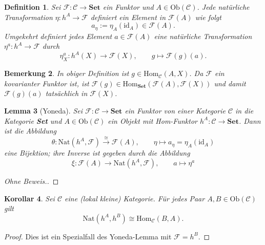 \documentclass[a4paper, 11pt]{scrartcl}
\newcommand{\Hom}{\text{Hom}}
\newcommand{\id}{\text{id}}
\newcommand{\Ob}{\text{Ob}}
\theoremstyle{basicstyle}
\newtheorem{definition}{Definition}[section]
\newtheorem{bemerkung}[definition]{Bemerkung}
\newtheorem{lemma}[definition]{Lemma}
\newtheorem{korollar}[definition]{Korollar}
\begin{document}
    \begin{definition}
        Sei \(\mathcal{F}: \mathcal{C} \to \textbf{Set}\) ein Funktor und \(A \in \Ob(\mathcal{C})\).
        Jede natürliche Transformation \(\eta: h^A \to \mathcal{F}\) definiert ein Element in \(\mathcal{F}(A)\) wie folgt
        \[a_{\eta} := \eta_A(\id_A) \in \mathcal{F}(A).\]
        Umgekehrt definiert jedes Element \(a \in \mathcal{F}(A)\) eine natürliche Transformation \(\eta^a: h^A \to \mathcal{F}\) durch
        \[\eta_X^a: h^A(X) \longrightarrow \mathcal{F}(X), \qquad g \mapsto \mathcal{F}(g)(a).\]
    \end{definition}

    \begin{bemerkung}
        In obiger Definition ist \(g \in \Hom_{\mathcal{C}}(A, X)\).
        Da \(\mathcal{F}\) ein kovarianter Funktor ist, ist \(\mathcal{F}(g) \in \Hom_{\textbf{Set}}(\mathcal{F}(A), \mathcal{F}(X))\) und damit \(\mathcal{F}(g)(a)\) tatsächlich in \(\mathcal{F}(X)\).
    \end{bemerkung}

    \begin{lemma}[Yoneda]\label{lem:yoneda}
        Sei \(\mathcal{F}: \mathcal{C} \to \textbf{Set}\) ein Funktor von einer Kategorie \(\mathcal{C}\) in die Kategorie \textbf{Set} und \(A \in \Ob(\mathcal{C})\) ein Objekt mit Hom-Funktor \(h^A : \mathcal{C} \to \textbf{Set}\).
        Dann ist die Abbildung
        \[\theta : \text{Nat}(h^A, \mathcal{F}) \overset{\cong}{\longrightarrow} \mathcal{F}(A), \qquad \eta \mapsto a_{\eta} = \eta_A(\id_A)\]
        eine Bijektion; ihre Inverse ist gegeben durch die Abbildung
        \[\xi : \mathcal{F}(A) \longrightarrow \text{Nat}(h^A, \mathcal{F}), \qquad a \mapsto \eta^a\]
    \end{lemma}
    \begin{proof}[Ohne Beweis.]
    \end{proof}

    \begin{korollar}\label{kor:1}
        Sei \(\mathcal{C}\) eine (lokal kleine) Kategorie.
        Für jedes Paar \(A, B \in \Ob(\mathcal{C})\) gilt %
        \[\text{Nat}(h^A, h^B) \cong \Hom_{\mathcal{C}}(B, A).\]
    \end{korollar}
    \begin{proof}
        Dies ist ein Spezialfall des Yoneda-Lemma mit \(\mathcal{F} = h^B\).
    \end{proof}
\end{document}
